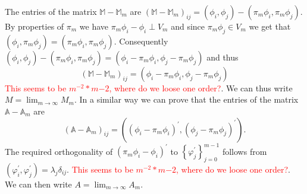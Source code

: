 \documentclass[a4paper,10pt]{article}
\newcommand{\inner}[2]{\ensuremath{\left(#1, #2\right)}}
\newcommand{\Amat}{\ensuremath{\mathbb{A}}}
\newcommand{\Mmat}{\ensuremath{\mathbb{M}}}
\newcommand{\Ammat}{\ensuremath{\mathbb{A}_m}}               %
\newcommand{\Mmmat}{\ensuremath{\mathbb{M}_m}}               %
\newcommand{\TODO}[1]{\textcolor{red}{#1}}
\begin{document}
  The entries of the matrix $\Mmat-\Mmmat$ are $\left(\Mmat-\Mmmat\right)_{ij}=
  \inner{\phi_i}{\phi_j}-\inner{\pi_m\phi_i}{\pi_m\phi_j}$. By properties of
  $\pi_m$ we have $\pi_m\phi_i - \phi_i \perp V_m$ and since $\pi_m\phi_j\in V_m$
  we get that $\inner{\phi_i}{\pi_m\phi_j}=\inner{\pi_m\phi_i}{\pi_m\phi_j}$.
  Consequently $\inner{\phi_i}{\phi_j}-\inner{\pi_m\phi_i}{\pi_m\phi_j} =
  \inner{\phi_i-\pi_m\phi_i}{\phi_j - \pi_m\phi_j}$ and thus
  \[
    \left(\Mmat-\Mmmat\right)_{ij} = \inner{\phi_i-\pi_m\phi_i}{\phi_j - \pi_m\phi_j}
  \]
  \TODO{This seems to be $m^{-2}*m{-2}$, where do we loose one order?}. We
  can thus write $M=\displaystyle\lim_{m\to\infty}M_m$.
  In a similar way we can prove that the entries of the matrix $\Amat-\Ammat$
  are
  \[
    \left(\Amat-\Ammat\right)_{ij} =
    \inner
    {\left(\phi_i-\pi_m\phi_i\right)^{\prime}}
    {\left(\phi_j - \pi_m\phi_j\right)^{\prime}}.
  \]
  The required orthogonality of $\left(\pi_m\phi_i - \phi_i\right)^{\prime}$ to
  $\left\{\varphi^{\prime}_j\right\}_{j=0}^{m-1}$ follows from  
  $\inner{\varphi_i^{\prime}}{\varphi_j^{\prime}}=\lambda_j\delta_{ij}$.
  \TODO{This seems to be $m^{-2}*m{-2}$, where do we loose one order?}. We
  can then write $A=\displaystyle\lim_{m\to\infty}A_m$.
\end{document}
